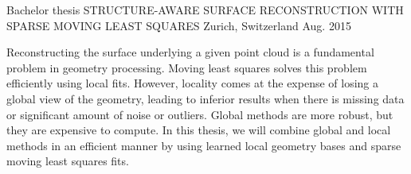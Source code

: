 \begin{cventries}
  \cventry
    {Bachelor thesis} %
    {STRUCTURE-AWARE SURFACE RECONSTRUCTION WITH SPARSE MOVING LEAST SQUARES} %
    {Zurich, Switzerland} %
    {Aug. 2015} %
    {
      \begin{cvitems} %
        \item {
        Reconstructing the surface underlying a given point cloud is a fundamental problem in geometry processing. Moving least squares solves this problem efficiently using local fits. However, locality comes at the expense of losing a global view of the geometry, leading to inferior results when there is missing data or significant amount of noise or outliers. Global methods are more robust, but they are expensive to compute. In this thesis, we will combine global and local methods in an efficient manner by using learned local geometry bases and sparse moving least squares fits.
        }
      \end{cvitems}
    }

\end{cventries}
